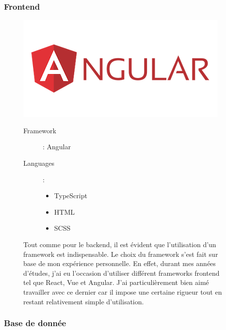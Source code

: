 \newpage

\subsubsection{Frontend}
\begin{figure}[H]
  \begin{minipage}{.3\textwidth}
    \includegraphics[width=0.75\linewidth]{img/tech/Angular.png}
  \end{minipage}
  \begin{minipage}{.7\textwidth}
    \begin{description}
      \item[Framework]: Angular
      \item[Languages]: \begin{itemize}
        \item TypeScript
        \item HTML
        \item SCSS
      \end{itemize} 
    \end{description}
    Tout comme pour le backend, il est évident que l'utilisation d'un framework est indispensable. Le choix du framework s'est fait sur base de mon expérience personnelle. En effet, durant mes années d'études, j'ai eu l'occasion d'utiliser différent frameworks frontend tel que React, Vue et Angular. J'ai particulièrement bien aimé travailler avec ce dernier car il impose une certaine rigueur tout en restant relativement simple d'utilisation.
  \end{minipage}
\end{figure}

\subsubsection{Base de donnée}

